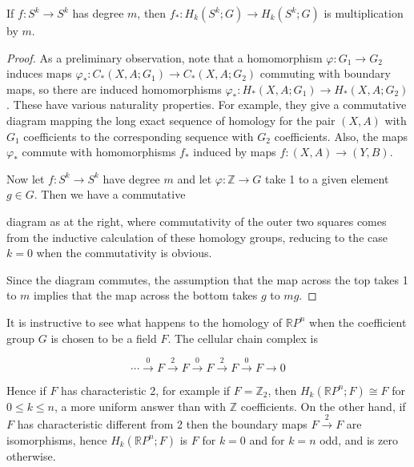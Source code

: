 \begin{lemma}
\label{lem:homology-map-degree-m-coefficients}
If $f: S^k \to S^k$ has degree $m$, then $f_*: H_k(S^k; G) \to H_k(S^k; G)$ is multiplication by $m$.
\end{lemma}
\begin{proof}
 As a preliminary observation, note that a homomorphism $\varphi: G_1 \to G_2$ induces maps $\varphi_*: C_*(X, A; G_1) \to C_*(X, A; G_2)$ commuting with boundary maps, so there are induced homomorphisms $\varphi_*: H_*(X, A; G_1) \to H_*(X, A; G_2)$. These have various naturality properties. For example, they give a commutative diagram mapping the long exact sequence of homology for the pair $(X, A)$ with $G_1$ coefficients to the corresponding sequence with $G_2$ coefficients. Also, the maps $\varphi_*$ commute with homomorphisms $f_*$ induced by maps $f: (X, A) \to (Y, B)$.

Now let $f: S^k \to S^k$ have degree $m$ and let $\varphi: \mathbb{Z} \to G$ take 1 to a given element $g \in G$. Then we have a commutative


diagram as at the right, where commutativity of the outer two squares comes from the inductive calculation of these homology groups, reducing to the case $k=0$ when the commutativity is obvious.

Since the diagram commutes, the assumption that the map across the top takes 1 to $m$ implies that the map across the bottom takes $g$ to $mg$.
\end{proof}
\begin{example}
\label{ex:homology-rpn-field-coefficients}
It is instructive to see what happens to the homology of $\mathbb{R}P^n$ when the coefficient group $G$ is chosen to be a field $F$. The cellular chain complex is
\end{example}

\[\cdots \xrightarrow{0} F \xrightarrow{2} F \xrightarrow{0} F \xrightarrow{2} F \xrightarrow{0} F \to 0\]

Hence if $F$ has characteristic 2, for example if $F = \mathbb{Z}_2$, then $H_k(\mathbb{R}P^n; F) \cong F$ for $0 \le k \le n$, a more uniform answer than with $\mathbb{Z}$ coefficients. On the other hand, if $F$ has characteristic different from 2 then the boundary maps $F \xrightarrow{2} F$ are isomorphisms, hence $H_k(\mathbb{R}P^n; F)$ is $F$ for $k = 0$ and for $k = n$ odd, and is zero otherwise.

